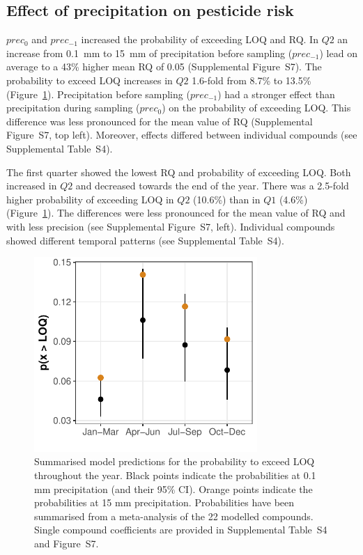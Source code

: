 \documentclass[journal=esthag,manuscript=article]{achemso}
\begin{document}
\subsection{Effect of precipitation on pesticide risk}
$prec_{0}$ and $prec_{-1}$ increased the probability of exceeding LOQ and RQ.
In $Q2$ an increase from 0.1~mm to 15~mm of precipitation before sampling ($prec_{-1}$) lead on average to a 43\% higher mean RQ of 0.05 (Supplemental Figure~S7).
The probability to exceed LOQ increases in $Q2$ 1.6-fold from 8.7\% to 13.5\% (Figure~\ref{fig:fig5}). %
Precipitation before sampling ($prec_{-1}$) had a stronger effect than precipitation during sampling ($prec_{0}$) on the probability of exceeding LOQ. 
This difference was less pronounced for the mean value of RQ (Supplemental Figure~S7, top left). 
Moreover, effects differed between individual compounds (see Supplemental Table~S4). 

The first quarter showed the lowest RQ and probability of exceeding LOQ.
Both increased in $Q2$ and decreased towards the end of the year.
There was a 2.5-fold higher probability of exceeding LOQ in $Q2$ (10.6\%) than in $Q1$ (4.6\%) (Figure~\ref{fig:fig5}).
The differences were less pronounced for the mean value of RQ and with less precision  (see Supplemental Figure~S7, left).
Individual compounds showed different temporal patterns (see Supplemental Table~S4). 


\begin{figure}[ht]
  \includegraphics[width=3.33in]{figure5.pdf}
  \caption{Summarised model predictions for the probability to exceed LOQ throughout the year. Black points indicate the probabilities at 0.1 mm precipitation (and their 95\% CI). 
  Orange points indicate the probabilities at 15 mm precipitation.
  Probabilities have been summarised from a meta-analysis of the 22 modelled compounds.
  Single compound coefficients are provided in Supplemental Table~S4 and Figure~S7.
  }
  \label{fig:fig5}
\end{figure}
\end{document}
